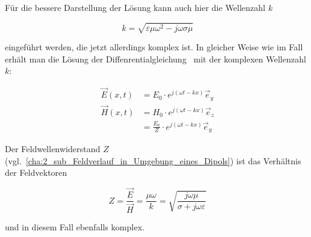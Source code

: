 Für die bessere Darstellung der Lösung kann auch hier die Wellenzahl $k$ 

\begin{equation}
    k = \sqrt{\varepsilon \mu \omega^2 - j \omega \sigma \mu}
\end{equation}

eingeführt werden, die jetzt allerdings komplex ist. In gleicher Weise wie im Fall~ erhält man die Lösung der Diffenrentialgleichung~\cite{Methoden_physikalischer_Mathematik_Band_2} mit der komplexen Wellenzahl $k$:

\begin{subequations}
    \begin{align}
        \vec E(x,t) &= E_0 \cdot e^{j (\omega t - k x)} \vec e_y \\
        \vec H(x,t) &= H_0 \cdot e^{j (\omega t - k x)} \vec e_z \nonumber \\
                    &= \frac{E_0}{Z} \cdot e^{j (\omega t - k x)} \vec e_y
    \end{align}
    \label{eq:A_Wellengleichungen_mit_Leitfaehigkeit}
\end{subequations}

Der Feldwellenwiderstand $Z$ (vgl.~\Abschnitt \ref{cha:2_sub_Feldverlauf_in_Umgebung_eines_Dipols}) ist das Verhältnis der Feldvektoren

\begin{equation}
    Z = \frac{\vec E}{\vec H} = \frac{\mu \omega}{k} = \sqrt{\frac{j \omega \mu}{\sigma + j \omega \varepsilon}}
\end{equation}

und in diesem Fall ebenfalls komplex.




